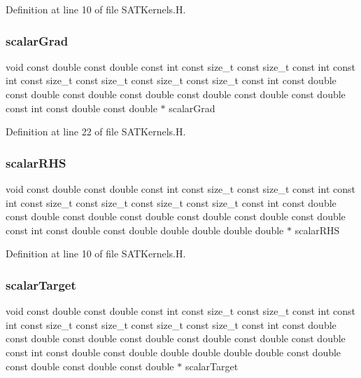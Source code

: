 Definition at line 10 of file S\+A\+T\+Kernels.\+H.

\hypertarget{SATKernels_8H_ad7f181d487933e1f440902dc6f080e54}{}\label{SATKernels_8H_ad7f181d487933e1f440902dc6f080e54} 
\subsubsection{\texorpdfstring{scalar\+Grad}{scalarGrad}}
{\footnotesize\ttfamily void const double const double const int const size\+\_\+t const size\+\_\+t const int const int const size\+\_\+t const size\+\_\+t const size\+\_\+t const size\+\_\+t const int const double const double const double const double const double const double const double const int const double const double $\ast$ scalar\+Grad}



Definition at line 22 of file S\+A\+T\+Kernels.\+H.

\hypertarget{SATKernels_8H_a409c39c77cbb195e5f02d1a9e96aa20d}{}\label{SATKernels_8H_a409c39c77cbb195e5f02d1a9e96aa20d} 
\subsubsection{\texorpdfstring{scalar\+R\+HS}{scalarRHS}}
{\footnotesize\ttfamily void const double const double const int const size\+\_\+t const size\+\_\+t const int const int const size\+\_\+t const size\+\_\+t const size\+\_\+t const size\+\_\+t const int const double const double const double const double const double const double const double const int const double const double double double double double $\ast$ scalar\+R\+HS}



Definition at line 10 of file S\+A\+T\+Kernels.\+H.

\hypertarget{SATKernels_8H_a3dcb404dac2bbafd2e5ac51b38fd8549}{}\label{SATKernels_8H_a3dcb404dac2bbafd2e5ac51b38fd8549} 
\subsubsection{\texorpdfstring{scalar\+Target}{scalarTarget}}
{\footnotesize\ttfamily void const double const double const int const size\+\_\+t const size\+\_\+t const int const int const size\+\_\+t const size\+\_\+t const size\+\_\+t const size\+\_\+t const int const double const double const double const double const double const double const double const int const double const double double double double double const double const double const double const double $\ast$ scalar\+Target}



